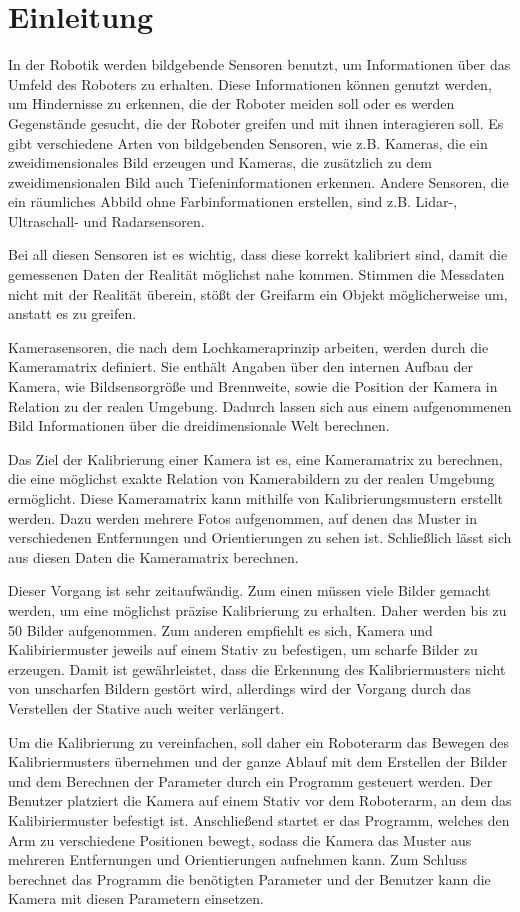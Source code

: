 \chapter{Einleitung}

In der Robotik werden bildgebende Sensoren benutzt, um Informationen über das Umfeld des Roboters zu erhalten. Diese Informationen können genutzt werden, um Hindernisse zu erkennen, die der Roboter meiden soll oder es werden Gegenstände gesucht, die der Roboter greifen und mit ihnen interagieren soll. Es gibt verschiedene Arten von bildgebenden Sensoren, wie z.B. Kameras, die ein zweidimensionales Bild erzeugen und Kameras, die zusätzlich zu dem zweidimensionalen Bild auch Tiefeninformationen erkennen. Andere Sensoren, die ein räumliches Abbild ohne Farbinformationen erstellen, sind z.B. Lidar-, Ultraschall- und Radarsensoren.

Bei all diesen Sensoren ist es wichtig, dass diese korrekt kalibriert sind, damit die gemessenen Daten der Realität möglichst nahe kommen. Stimmen die Messdaten nicht mit der Realität überein, stößt der Greifarm ein Objekt möglicherweise um, anstatt es zu greifen.

Kamerasensoren, die nach dem Lochkameraprinzip arbeiten, werden durch die Kameramatrix definiert. Sie enthält Angaben über den internen Aufbau der Kamera, wie Bildsensorgröße und Brennweite, sowie die Position der Kamera in Relation zu der realen Umgebung. Dadurch lassen sich aus einem aufgenommenen Bild Informationen über die dreidimensionale Welt berechnen. 

Das Ziel der Kalibrierung einer Kamera ist es, eine Kameramatrix zu berechnen, die eine möglichst exakte Relation von Kamerabildern zu der realen Umgebung ermöglicht. Diese Kameramatrix kann mithilfe von Kalibrierungsmustern erstellt werden. Dazu werden mehrere Fotos aufgenommen, auf denen das Muster in verschiedenen Entfernungen und Orientierungen zu sehen ist. Schließlich lässt sich aus diesen Daten die Kameramatrix berechnen.

Dieser Vorgang ist sehr zeitaufwändig. Zum einen müssen viele Bilder gemacht werden, um eine möglichst präzise Kalibrierung zu erhalten. Daher werden bis zu 50 Bilder aufgenommen. Zum anderen empfiehlt es sich, Kamera und Kalibiriermuster jeweils auf einem Stativ zu befestigen, um scharfe Bilder zu erzeugen. Damit ist gewährleistet, dass die Erkennung des Kalibriermusters nicht von unscharfen Bildern gestört wird, allerdings wird der Vorgang durch das Verstellen der Stative auch weiter verlängert.

Um die Kalibrierung zu vereinfachen, soll daher ein Roboterarm das Bewegen des Kalibriermusters übernehmen und der ganze Ablauf mit dem Erstellen der Bilder und dem Berechnen der Parameter durch ein Programm gesteuert werden. Der Benutzer platziert die Kamera auf einem Stativ vor dem Roboterarm, an dem das Kalibiriermuster befestigt ist. Anschließend startet er das Programm, welches den Arm zu verschiedene Positionen bewegt, sodass die Kamera das Muster aus mehreren Entfernungen und Orientierungen aufnehmen kann. Zum Schluss berechnet das Programm die benötigten Parameter und der Benutzer kann die Kamera mit diesen Parametern einsetzen.


